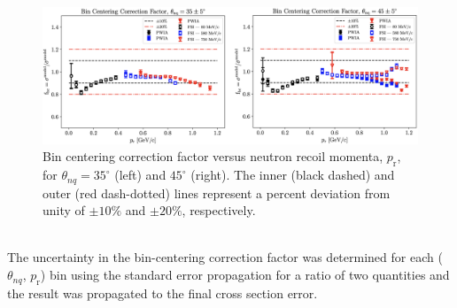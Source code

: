 \documentclass[aps, prl]{revtex4-2}  %
\begin{document}
\begin{figure}[!ht]
\includegraphics[scale=0.27]{plots/BC_factor.png}
\caption{Bin centering correction factor versus neutron recoil momenta, $p_{\mathrm{r}}$, for $\theta_{nq}=35^{\circ}$ (left) and $45^{\circ}$ (right).
  The inner (black dashed) and outer (red dash-dotted) lines represent a percent deviation from unity of $\pm10\%$ and $\pm20\%$, respectively.}
\label{fig:BC_factor}
\end{figure}\\
\indent The uncertainty in the bin-centering correction factor was determined for each  ($\theta_{nq}$, $p_{\mathrm{r}}$) bin
using the standard error propagation for a ratio of two quantities and the result was propagated to the final cross section error. \\
\end{document}

